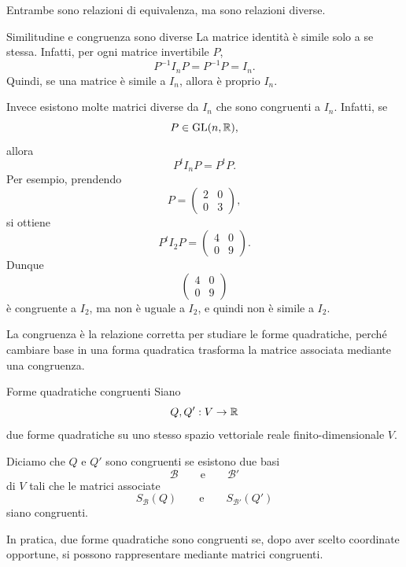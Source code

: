 \documentclass[a4paper]{article}
\begin{document}
Entrambe sono relazioni di equivalenza, ma sono relazioni diverse.

\begin{snippetremark}{Similitudine e congruenza sono diverse}
    La matrice identità è simile solo a se stessa. Infatti, per ogni matrice invertibile \(P\),
    \[
        P^{-1}I_nP=P^{-1}P=I_n.
    \]
    Quindi, se una matrice è simile a \(I_n\), allora è proprio \(I_n\).

    Invece esistono molte matrici diverse da \(I_n\) che sono congruenti a \(I_n\). Infatti, se
    \[
        P\in\operatorname{GL}(n,\mathbb{R}),
    \]
    allora
    \[
        P^tI_nP=P^tP.
    \]
    Per esempio, prendendo
    \[
        P=
        \begin{pmatrix}
            2 & 0\\
            0 & 3
        \end{pmatrix},
    \]
    si ottiene
    \[
        P^tI_2P
        =
        \begin{pmatrix}
            4 & 0\\
            0 & 9
        \end{pmatrix}.
    \]
    Dunque
    \[
        \begin{pmatrix}
            4 & 0\\
            0 & 9
        \end{pmatrix}
    \]
    è congruente a \(I_2\), ma non è uguale a \(I_2\), e quindi non è simile a \(I_2\).
\end{snippetremark}

La congruenza è la relazione corretta per studiare le forme quadratiche, perché cambiare base in una forma quadratica trasforma la matrice associata mediante una congruenza.

\begin{snippetdefinition}{Forme quadratiche congruenti}
    Siano
    \[
        Q,Q':V\to\mathbb{R}
    \]
    due forme quadratiche su uno stesso spazio vettoriale reale finito-dimensionale \(V\).

    Diciamo che \(Q\) e \(Q'\) sono congruenti se esistono due basi
    \[
        \mathcal{B}
        \qquad
        \text{e}
        \qquad
        \mathcal{B}'
    \]
    di \(V\) tali che le matrici associate
    \[
        S_{\mathcal{B}}(Q)
        \qquad
        \text{e}
        \qquad
        S_{\mathcal{B}'}(Q')
    \]
    siano congruenti.
\end{snippetdefinition}

In pratica, due forme quadratiche sono congruenti se, dopo aver scelto coordinate opportune, si possono rappresentare mediante matrici congruenti.
\end{document}
